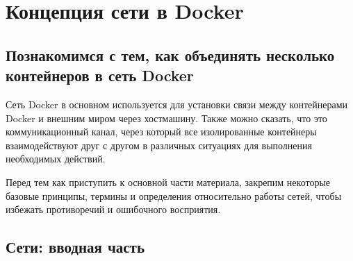 \documentclass[letterpaper,10pt,russian]{sphinxmanual}
\begin{document}
\section{Концепция сети в Docker}
\label{\detokenize{educational_materials/docker_network/content:docker}}\label{\detokenize{educational_materials/docker_network/content::doc}}

\subsection{Познакомимся с тем, как объединять несколько контейнеров в сеть Docker}
\label{\detokenize{educational_materials/docker_network/content:id1}}
\sphinxAtStartPar
Сеть Docker в основном используется для установки связи между контейнерами Docker и внешним миром через хост\sphinxhyphen{}машину. Также можно сказать, что это коммуникационный канал, через который все изолированные контейнеры взаимодействуют друг с другом в различных ситуациях для выполнения необходимых действий.

\sphinxAtStartPar
Перед тем как приступить к основной части материала, закрепим некоторые базовые принципы, термины и определения относительно работы сетей, чтобы избежать противоречий и ошибочного восприятия.


\subsection{Сети: вводная часть}
\label{\detokenize{educational_materials/docker_network/content:id2}}
\end{document}
